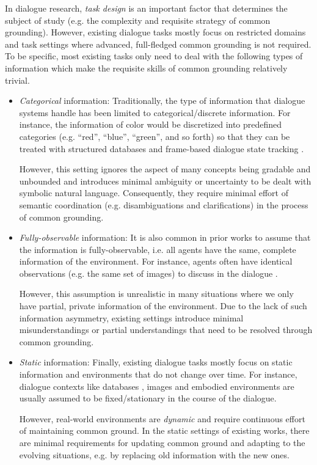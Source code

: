 In dialogue research, \textit{task design} is an important factor that determines the subject of study (e.g. the complexity and requisite strategy of common grounding). However, existing dialogue tasks mostly focus on restricted domains and task settings where advanced, full-fledged common grounding is not required. To be specific, most existing tasks only need to deal with the following types of information which make the requisite skills of common grounding relatively trivial.

\begin{itemize}
\item \textit{Categorical} information: Traditionally, the type of information that dialogue systems handle has been limited to categorical/discrete information. For instance, the information of color would be discretized into predefined categories (e.g. ``red'', ``blue'', ``green'', and so forth) so that they can be treated with structured databases and frame-based dialogue state tracking \citep{Henderson2015}.

However, this setting ignores the aspect of many concepts being gradable and unbounded \citep{Lakoff87,paradis_2008} and introduces minimal ambiguity or uncertainty to be dealt with symbolic natural language. Consequently, they require minimal effort of semantic coordination (e.g. disambiguations and clarifications) in the process of common grounding.

\item \textit{Fully-observable} information: It is also common in prior works to assume that the information is fully-observable, i.e. all agents have the same, complete information of the environment. For instance, agents often have identical observations (e.g. the same set of images) to discuss in the dialogue \citep{zarriess-etal-2016-pentoref,de2017guesswhat,shore-etal-2018-kth}.

However, this assumption is unrealistic in many situations where we only have partial, private information of the environment. Due to the lack of such information asymmetry, existing settings introduce minimal misunderstandings or partial understandings that need to be resolved through common grounding.

\item \textit{Static} information: Finally, existing dialogue tasks mostly focus on static information and environments that do not change over time. For instance, dialogue contexts like databases \citep{he2017learning}, images \citep{haber-etal-2019-photobook} and embodied environments \citep{de2018talk,thomason:corl19} are usually assumed to be fixed/stationary in the course of the dialogue.

However, real-world environments are \textit{dynamic} and require continuous effort of maintaining common ground. In the static settings of existing works, there are minimal requirements for updating common ground and adapting to the evolving situations, e.g. by replacing old information with the new ones.

\end{itemize}

